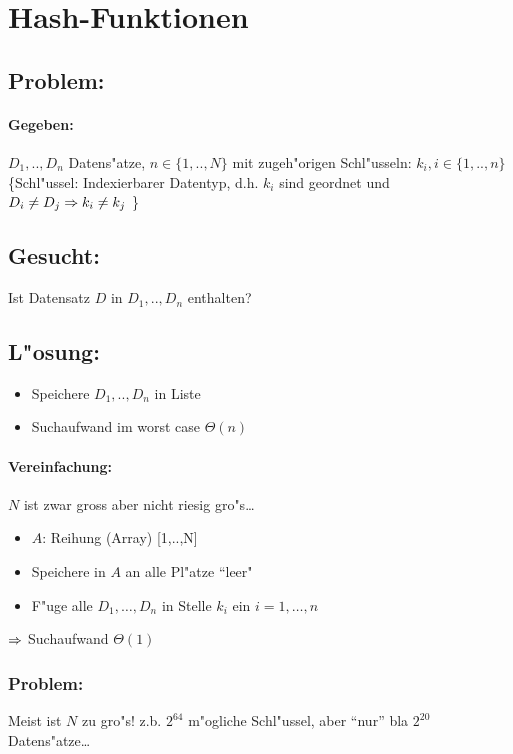\documentclass[a4paper,twoside,DIV15,BCOR12mm]{scrbook}
\begin{document}
\section{Hash-Funktionen}

\subsection*{Problem:}
	\paragraph{Gegeben:} $D_1,..,D_n$ Datens"atze, $n \in \{1,..,N\}$ mit zugeh"origen Schl"usseln: $k_i, i\in\{1,..,n\}$\\
	\{Schl"ussel: Indexierbarer Datentyp, d.h. $k_i$ sind geordnet und $D_i \ne D_j \Rightarrow k_i \ne k_j$ \}

\subsection*{Gesucht:} 
		Ist Datensatz $D$ in $D_1,..,D_n$ enthalten?
	
\subsection*{L"osung:}
\begin{itemize}
\item 
	Speichere $D_1,..,D_n$ in Liste 
\item 
	Suchaufwand im worst case $\Theta(n)$
\end{itemize}
\paragraph{Vereinfachung:} $N$ ist zwar gross aber nicht riesig gro"s\dots
\begin{itemize}
\item	$A$: Reihung (Array) [1,..,N]
\item	Speichere in $A$ an alle Pl"atze ``leer"
\item	F"uge alle $D_1,\dots,D_n$ in Stelle $k_i$ ein $i=1,\dots,n$
\end{itemize}
$\Rightarrow$ Suchaufwand $\Theta(1)$
		
\subsubsection*{Problem:}
		Meist ist $N$ zu gro"s!
			z.b. $2^{64}$ m"ogliche Schl"ussel, aber "`nur"' bla $2^{20}$ Datens"atze\dots
\end{document}
